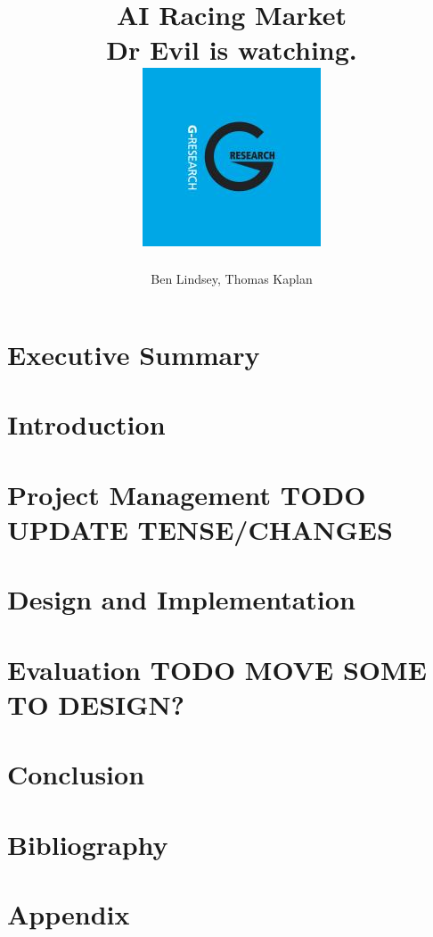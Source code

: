 \documentclass[11pt]{report}
\title{	
  {\huge AI Racing Market}\\
  {\large Dr Evil is watching.}\\[2em]
  {\includegraphics[scale=0.5]{G-Research.jpg}}
}
\author{Ben Lindsey, Thomas Kaplan}
\begin{document}
\maketitle

\tableofcontents

\chapter{Executive Summary}


\chapter{Introduction}


\chapter{Project Management TODO UPDATE TENSE/CHANGES}


\chapter{Design and Implementation}


\chapter{Evaluation TODO MOVE SOME TO DESIGN?}


\chapter{Conclusion}


\chapter{Bibliography}
\printbibliography

\appendix
\chapter{Appendix}

\end{document}
